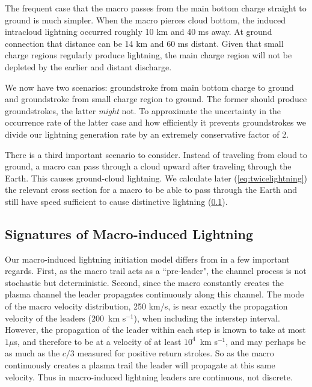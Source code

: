 \documentclass[%
 reprint,
 amsmath,amssymb,
 aps,
]{revtex4-2}
\begin{document}
        The frequent case that the macro passes from the main bottom charge straight to ground is much simpler. When the macro pierces cloud bottom, the induced intracloud lightning occurred roughly 10 km and 40 ms away. At ground connection that distance can be 14 km and 60 ms distant. Given that small charge regions regularly produce lightning, the main charge region will not be depleted by the earlier and distant discharge.

        We now have two scenarios: groundstroke from main bottom charge to ground and groundstroke from small charge region to ground. The former should produce groundstrokes, the latter \textit{might} not. To approximate the uncertainty in the occurrence rate of the latter case and how efficiently it prevents groundstrokes we divide our lightning generation rate by an extremely conservative factor of 2.
        
        There is a third important scenario to consider. Instead of traveling from cloud to ground, a macro can pass through a cloud upward after traveling through the Earth. This causes ground-cloud lightning. We calculate later (\ref{eq:twicelightning}) the relevant cross section for a macro to be able to pass through the Earth and still have speed sufficient to cause distinctive lightning (\ref{sec:signatures_of_macro_induced_lightning}).


    \subsection{Signatures of Macro-induced Lightning} %
    \label{sec:signatures_of_macro_induced_lightning}

        Our macro-induced lightning initiation model differs from \citet{DwyerUman2014} in a few important regards. First, as the macro trail acts as a ``pre-leader", the channel process is not stochastic but deterministic. Second, since the macro constantly creates the plasma channel the leader propagates continuously along this channel. The mode of the macro velocity distribution, 250 km/s, is near exactly the propagation velocity of the leaders ($200\,$ km s$^{-1}$), when including the interstep interval. However, the propagation of the leader within each step is known to take at most $1\mu$s, and therefore to be at a velocity of at least $10^4\,$ km s$^{-1}$, and may perhaps be as much as the $c/3$ measured for positive return strokes. So as the macro continuously creates a plasma trail the leader will propagate at this same velocity. Thus in macro-induced lightning leaders are continuous, not discrete.
\end{document}
